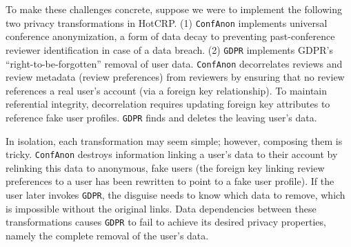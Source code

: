 %
To make these challenges concrete, suppose we were to implement the following two privacy
transformations in HotCRP. 
%
(1) \texttt{ConfAnon} implements universal conference anonymization, a form of data decay to
preventing past-conference reviewer identification in case of a data breach.
%
(2) \texttt{GDPR} implements GDPR's ``right-to-be-forgotten'' removal of user data.
%
\texttt{ConfAnon} decorrelates reviews and review metadata (\eg review preferences) from reviewers
by ensuring that no review references a real user's account (via a foreign key relationship).
To maintain referential integrity, decorrelation requires updating foreign key
attributes to reference fake user profiles.
\texttt{GDPR} finds and deletes the leaving user's data.
%

%
In isolation, each transformation may seem simple; however, composing them is tricky.
\texttt{ConfAnon} destroys information linking a user's data to their account by relinking this data
to anonymous, fake users (\eg the foreign key linking review preferences to a user has been rewritten to
point to a fake user profile).  If the user later invokes \texttt{GDPR}, the
disguise needs to know which data to remove, which is impossible without the original links.
%
Data dependencies between these transformations causes \texttt{GDPR} to
fail to achieve its desired privacy properties, namely the complete removal of the user's data.
%
